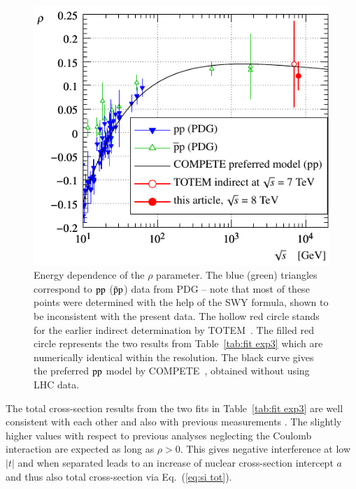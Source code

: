\begin{figure}
\begin{center}
\includegraphics{fig/rho_s.pdf}
\caption{Energy dependence of the $\rho$ parameter. The blue (green) triangles correspond to $\rm pp$ ($\rm \bar pp$) data from PDG \cite{pdg} -- note that most of these points were determined with the help of the SWY formula, shown to be inconsistent with the present data. The hollow red circle stands for the earlier indirect determination by TOTEM~\cite{epl101-tot}. The filled red circle represents the two results from Table~\ref{tab:fit exp3} which are numerically identical within the resolution. The black curve gives the preferred $\rm pp$ model by COMPETE~\cite{compete}, obtained without using LHC data.
}%
\label{fig:rho cmp exp3}
\end{center}
\end{figure}


The total cross-section results from the two fits in Table~\ref{tab:fit exp3} are well consistent with each other and also with previous measurements \cite{8tev-90m,prl111}. The slightly higher values with respect to previous analyses neglecting the Coulomb interaction are expected as long as $\rho > 0$. This gives negative interference at low $|t|$ and when separated leads to an increase of nuclear cross-section intercept $a$ and thus also total cross-section via Eq.~(\ref{eq:si tot}).


